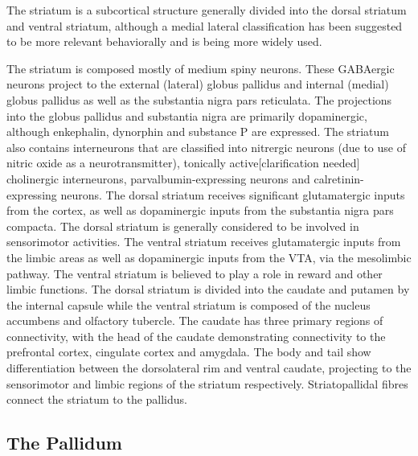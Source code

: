 \documentclass[]{book}
\begin{document}
The striatum is a subcortical structure generally divided into the dorsal striatum and ventral striatum, although a medial lateral classification has been suggested to be more relevant behaviorally and is being more widely used.

The striatum is composed mostly of medium spiny neurons. These GABAergic neurons project to the external (lateral) globus pallidus and internal (medial) globus pallidus as well as the substantia nigra pars reticulata. The projections into the globus pallidus and substantia nigra are primarily dopaminergic, although enkephalin, dynorphin and substance P are expressed. The striatum also contains interneurons that are classified into nitrergic neurons (due to use of nitric oxide as a neurotransmitter), tonically active{[}clarification needed{]} cholinergic interneurons, parvalbumin-expressing neurons and calretinin-expressing neurons. The dorsal striatum receives significant glutamatergic inputs from the cortex, as well as dopaminergic inputs from the substantia nigra pars compacta. The dorsal striatum is generally considered to be involved in sensorimotor activities. The ventral striatum receives glutamatergic inputs from the limbic areas as well as dopaminergic inputs from the VTA, via the mesolimbic pathway. The ventral striatum is believed to play a role in reward and other limbic functions. The dorsal striatum is divided into the caudate and putamen by the internal capsule while the ventral striatum is composed of the nucleus accumbens and olfactory tubercle. The caudate has three primary regions of connectivity, with the head of the caudate demonstrating connectivity to the prefrontal cortex, cingulate cortex and amygdala. The body and tail show differentiation between the dorsolateral rim and ventral caudate, projecting to the sensorimotor and limbic regions of the striatum respectively. Striatopallidal fibres connect the striatum to the pallidus.

\hypertarget{the-pallidum}{%
\subsection{The Pallidum}\label{the-pallidum}}
\end{document}
